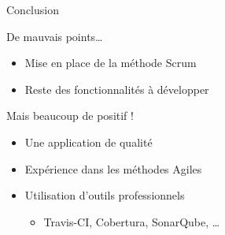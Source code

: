 \AntoineSpeak
\begin{frame}{Conclusion}
	\begin{alertblock}{De mauvais points\ldots}
		\begin{itemize}
			\item Mise en place de la méthode Scrum
			\item Reste des fonctionnalités à développer
		\end{itemize}
	\end{alertblock}
	\vfill
	\begin{exampleblock}{Mais beaucoup de positif !}
		\begin{itemize}
			\item Une application de qualité
			\item Expérience dans les méthodes Agiles
			\item Utilisation d'outils professionnels
			\begin{itemize}
				\item Travis-CI, Cobertura, SonarQube, \ldots
			\end{itemize}
		\end{itemize}
	\end{exampleblock}
\end{frame}
